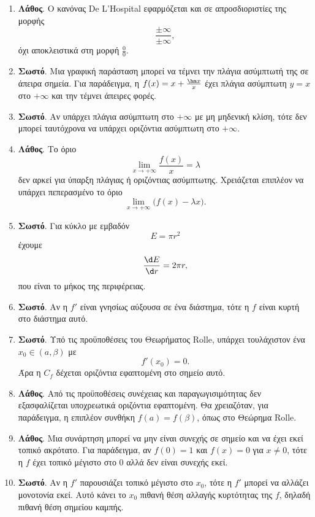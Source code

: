\begin{enumerate}[label=\textbf{2.\arabic*.}]
\item \textbf{Λάθος}. Ο κανόνας De L'Hospital εφαρμόζεται και σε απροσδιοριστίες της μορφής
\[
\frac{\pm\infty}{\pm\infty},
\]
όχι αποκλειστικά στη μορφή $\frac00$.

\item \textbf{Σωστό}. Μια γραφική παράσταση μπορεί να τέμνει την πλάγια ασύμπτωτή της σε άπειρα σημεία. Για παράδειγμα, η $f(x)=x+\frac{\hm x}{x}$ έχει πλάγια ασύμπτωτη $y=x$ στο $+\infty$ και την τέμνει άπειρες φορές.

\item \textbf{Σωστό}. Αν υπάρχει πλάγια ασύμπτωτη στο $+\infty$ με μη μηδενική κλίση, τότε δεν μπορεί ταυτόχρονα να υπάρχει οριζόντια ασύμπτωτη στο $+\infty$.

\item \textbf{Λάθος}. Το όριο
\[
\lim_{x\to+\infty}\frac{f(x)}{x}=\lambda
\]
δεν αρκεί για ύπαρξη πλάγιας ή οριζόντιας ασύμπτωτης. Χρειάζεται επιπλέον να υπάρχει πεπερασμένο το όριο
\[
\lim_{x\to+\infty}\bigl(f(x)-\lambda x\bigr).
\]

\item \textbf{Σωστό}. Για κύκλο με εμβαδόν
\[
E=\pi r^2
\]
έχουμε
\[
\frac{\d E}{\d r}=2\pi r,
\]
που είναι το μήκος της περιφέρειας.

\item \textbf{Σωστό}. Αν η $f'$ είναι γνησίως αύξουσα σε ένα διάστημα, τότε η $f$ είναι κυρτή στο διάστημα αυτό.

\item \textbf{Σωστό}. Υπό τις προϋποθέσεις του Θεωρήματος Rolle, υπάρχει τουλάχιστον ένα $x_0\in(a,\beta)$ με
\[
f'(x_0)=0.
\]
Άρα η $C_f$ δέχεται οριζόντια εφαπτομένη στο σημείο αυτό.

\item \textbf{Λάθος}. Από τις προϋποθέσεις συνέχειας και παραγωγισιμότητας δεν εξασφαλίζεται υποχρεωτικά οριζόντια εφαπτομένη. Θα χρειαζόταν, για παράδειγμα, η επιπλέον συνθήκη $f(a)=f(\beta)$, όπως στο Θεώρημα Rolle.

\item \textbf{Λάθος}. Μια συνάρτηση μπορεί να μην είναι συνεχής σε σημείο και να έχει εκεί τοπικό ακρότατο. Για παράδειγμα, αν $f(0)=1$ και $f(x)=0$ για $x\neq0$, τότε η $f$ έχει τοπικό μέγιστο στο $0$ αλλά δεν είναι συνεχής εκεί.

\item \textbf{Σωστό}. Αν η $f'$ παρουσιάζει τοπικό μέγιστο στο $x_0$, τότε η $f'$ μπορεί να αλλάζει μονοτονία εκεί. Αυτό κάνει το $x_0$ πιθανή θέση αλλαγής κυρτότητας της $f$, δηλαδή πιθανή θέση σημείου καμπής.


\end{enumerate}

